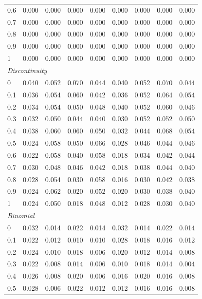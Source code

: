 \begin{table}[htbp]
\begin{tabular}{lcccccccc}
0.6 & 0.000 & 0.000 & 0.000 & 0.000 & 0.000 & 0.000 & 0.000 & 0.000 \\
0.7 & 0.000 & 0.000 & 0.000 & 0.000 & 0.000 & 0.000 & 0.000 & 0.000 \\
0.8 & 0.000 & 0.000 & 0.000 & 0.000 & 0.000 & 0.000 & 0.000 & 0.000 \\
0.9 & 0.000 & 0.000 & 0.000 & 0.000 & 0.000 & 0.000 & 0.000 & 0.000 \\
1 & 0.000 & 0.000 & 0.000 & 0.000 & 0.000 & 0.000 & 0.000 & 0.000 \\
\midrule
\multicolumn{9}{l}{\textit{Discontinuity}} \\
0 & 0.040 & 0.052 & 0.070 & 0.044 & 0.040 & 0.052 & 0.070 & 0.044 \\
0.1 & 0.036 & 0.054 & 0.060 & 0.042 & 0.036 & 0.052 & 0.064 & 0.054 \\
0.2 & 0.034 & 0.054 & 0.050 & 0.048 & 0.040 & 0.052 & 0.060 & 0.046 \\
0.3 & 0.032 & 0.050 & 0.044 & 0.040 & 0.030 & 0.052 & 0.052 & 0.050 \\
0.4 & 0.038 & 0.060 & 0.060 & 0.050 & 0.032 & 0.044 & 0.068 & 0.054 \\
0.5 & 0.024 & 0.058 & 0.050 & 0.066 & 0.028 & 0.046 & 0.044 & 0.046 \\
0.6 & 0.022 & 0.058 & 0.040 & 0.058 & 0.018 & 0.034 & 0.042 & 0.044 \\
0.7 & 0.030 & 0.048 & 0.046 & 0.042 & 0.018 & 0.038 & 0.044 & 0.040 \\
0.8 & 0.028 & 0.054 & 0.030 & 0.058 & 0.016 & 0.030 & 0.042 & 0.038 \\
0.9 & 0.024 & 0.062 & 0.020 & 0.052 & 0.020 & 0.030 & 0.038 & 0.040 \\
1 & 0.024 & 0.050 & 0.018 & 0.048 & 0.012 & 0.028 & 0.030 & 0.040 \\
\midrule
\multicolumn{9}{l}{\textit{Binomial}} \\
0 & 0.032 & 0.014 & 0.022 & 0.014 & 0.032 & 0.014 & 0.022 & 0.014 \\
0.1 & 0.022 & 0.012 & 0.010 & 0.010 & 0.028 & 0.018 & 0.016 & 0.012 \\
0.2 & 0.024 & 0.010 & 0.018 & 0.006 & 0.020 & 0.012 & 0.014 & 0.008 \\
0.3 & 0.022 & 0.008 & 0.014 & 0.006 & 0.010 & 0.018 & 0.014 & 0.004 \\
0.4 & 0.026 & 0.008 & 0.020 & 0.006 & 0.016 & 0.020 & 0.016 & 0.008 \\
0.5 & 0.028 & 0.006 & 0.022 & 0.012 & 0.012 & 0.016 & 0.016 & 0.008 \\

\end{tabular}
\end{table}
